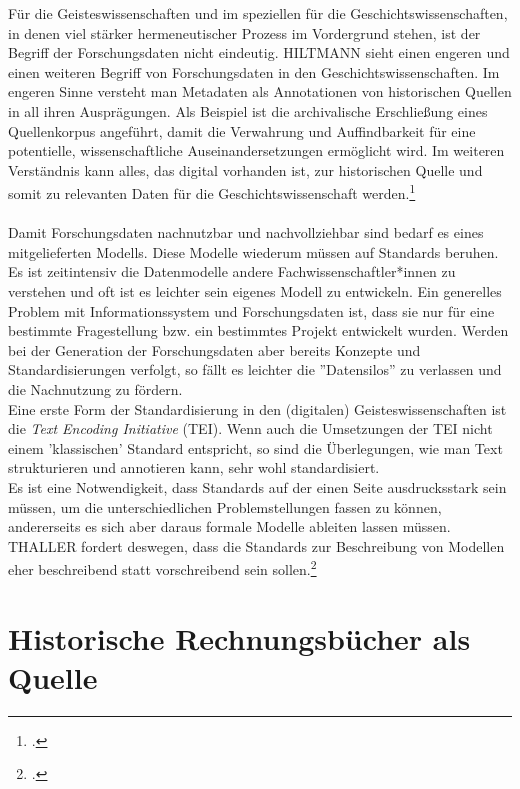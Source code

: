 \documentclass[12pt,a4paper]{article}
\begin{document}
Für die Geisteswissenschaften und im speziellen für die Geschichtswissenschaften, in denen viel stärker hermeneutischer Prozess im Vordergrund stehen, ist der Begriff der Forschungsdaten nicht eindeutig. HILTMANN sieht einen engeren und einen weiteren Begriff von Forschungsdaten in den Geschichtswissenschaften. Im engeren Sinne versteht man Metadaten als Annotationen von historischen Quellen in all ihren Ausprägungen. Als Beispiel ist die archivalische Erschließung eines Quellenkorpus angeführt, damit die Verwahrung und Auffindbarkeit für eine potentielle, wissenschaftliche Auseinandersetzungen ermöglicht wird. Im weiteren Verständnis kann alles, das digital vorhanden ist, zur historischen Quelle und somit zu relevanten Daten für die Geschichtswissenschaft werden.\footcite[][09.06.2019.]{hiltman2018forschungsdaten}
\\
\\
Damit Forschungsdaten nachnutzbar und nachvollziehbar sind bedarf es eines mitgelieferten Modells. Diese Modelle wiederum müssen auf Standards beruhen. Es ist zeitintensiv die Datenmodelle andere Fachwissenschaftler*innen zu verstehen und oft ist es leichter sein eigenes Modell zu entwickeln. Ein generelles Problem mit Informationssystem und Forschungsdaten ist, dass sie nur für eine bestimmte Fragestellung bzw. ein bestimmtes Projekt entwickelt wurden. Werden bei der Generation der Forschungsdaten aber bereits Konzepte und Standardisierungen verfolgt, so fällt es leichter die ''Datensilos'' zu verlassen und die Nachnutzung zu fördern. 
\\
Eine erste Form der Standardisierung in den (digitalen) Geisteswissenschaften ist die \textit{Text Encoding Initiative} (TEI). Wenn auch die Umsetzungen der TEI nicht einem 'klassischen' Standard entspricht, so sind die Überlegungen, wie man Text strukturieren und annotieren kann, sehr wohl standardisiert. 
\\
Es ist eine Notwendigkeit, dass Standards auf der einen Seite ausdrucksstark sein müssen, um die unterschiedlichen Problemstellungen fassen zu können, andererseits es sich aber daraus formale Modelle ableiten lassen müssen. THALLER fordert deswegen, dass die Standards zur Beschreibung von Modellen eher beschreibend statt vorschreibend sein sollen.\footcite[][S.204]{thaller2017need}


\newpage
\section{Historische Rechnungsbücher als Quelle}
\label{ref:Rechnung}
\end{document}
